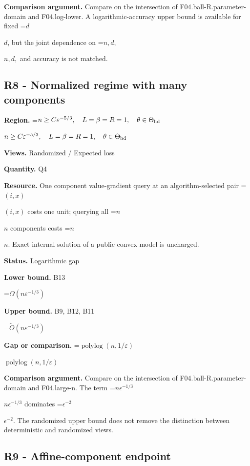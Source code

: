 \documentclass[10pt,a4paper]{article}
\newcommand{\AtlasMath}[1]{\par\begingroup\centering\setbox0=\hbox{$\displaystyle #1$}\ifdim\wd0>1.4\linewidth\typeout{ATLAS WIDE FORMULA: \the\wd0}\fi\ifdim\wd0>\linewidth\resizebox{\linewidth}{!}{\box0}\else\box0\fi\par\endgroup}
\newcommand{\AtlasInlineMath}[1]{\begingroup\setbox0=\hbox{$#1$}\ifdim\wd0>.4\linewidth\endgroup\AtlasMath{#1}\else\endgroup$#1$\fi}
\begin{document}
\textbf{Comparison argument.} Compare on the intersection of F04.ball-R.parameter-domain and F04.log-lower. A logarithmic-accuracy upper bound is available for fixed \AtlasInlineMath{d}, but the joint dependence on \AtlasInlineMath{n,d,} and accuracy is not matched.



\subsection{R8 - Normalized regime with many components}


\textbf{Region.} \AtlasInlineMath{n\ge C\varepsilon^{-5/3},\quad L=\beta=R=1,\quad\theta\in\Theta_{\rm hd}}



\textbf{Views.} Randomized / Expected loss



\textbf{Quantity.} Q4



\textbf{Resource.} One component value-gradient query at an algorithm-selected pair \AtlasInlineMath{(i,x)} costs one unit; querying all \AtlasInlineMath{n} components costs \AtlasInlineMath{n}. Exact internal solution of a public convex model is uncharged.



\textbf{Status.} Logarithmic gap



\textbf{Lower bound.} B13



\AtlasMath{\Omega(n\varepsilon^{-1/3})}


\textbf{Upper bound.} B9, B12, B11



\AtlasMath{\widetilde{O}(n\varepsilon^{-1/3})}


\textbf{Gap or comparison.} \AtlasInlineMath{\operatorname{polylog}(n,1/\varepsilon)}



\textbf{Comparison argument.} Compare on the intersection of F04.ball-R.parameter-domain and F04.large-n. The term \AtlasInlineMath{n\epsilon^{-1/3}} dominates \AtlasInlineMath{\epsilon^{-2}}. The randomized upper bound does not remove the distinction between deterministic and randomized views.



\subsection{R9 - Affine-component endpoint}
\end{document}
